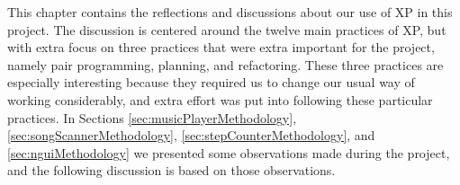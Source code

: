 This chapter contains the reflections and discussions about our use of XP in this project. The discussion is centered around the twelve main practices of XP, but with extra focus on three practices that were extra important for the project, namely pair programming, planning, and refactoring. These three practices are especially interesting because they required us to change our usual way of working considerably, and extra effort was put into following these particular practices. In Sections \ref{sec:musicPlayerMethodology}, \ref{sec:songScannerMethodology}, \ref{sec:stepCounterMethodology}, and \ref{sec:nguiMethodology} we presented some observations made during the project, and the following discussion is based on those observations.

